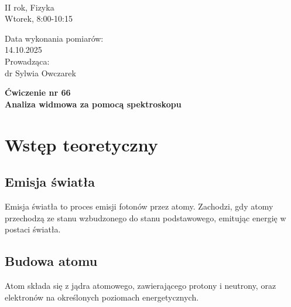 \documentclass[a4paper,12pt]{article}
\begin{document}
\noindent
\begin{minipage}{0.5\textwidth}
    \raggedright
    \textbf{} \\
    II rok, Fizyka \\
    Wtorek, 8:00-10:15 \\
    \vspace{0.5cm}
    \vspace{0.5cm}
\end{minipage}%
\begin{minipage}{0.5\textwidth}
    \raggedleft
    Data wykonania pomiarów: \\
    14.10.2025 \\
    \vspace{0.5cm}
    Prowadząca: \\
    dr Sylwia Owczarek
\end{minipage}

\vspace{2cm}
\begin{center}
    \LARGE \textbf{Ćwiczenie nr 66} \\[0.5cm]
    \Large \textbf{Analiza widmowa za pomocą spektroskopu}
\end{center}

\vspace{1cm} %
\noindent


\section{Wstęp teoretyczny}

\subsection*{Emisja światła}

Emisja światła to proces emisji fotonów przez atomy. Zachodzi, gdy atomy przechodzą ze stanu wzbudzonego do stanu podstawowego, emitując energię w postaci światła.~\cite{Drynski1976}

\subsection*{Budowa atomu}

Atom składa się z jądra atomowego, zawierającego protony i neutrony, oraz elektronów na określonych poziomach energetycznych.~\cite{Drynski1976}
\end{document}
